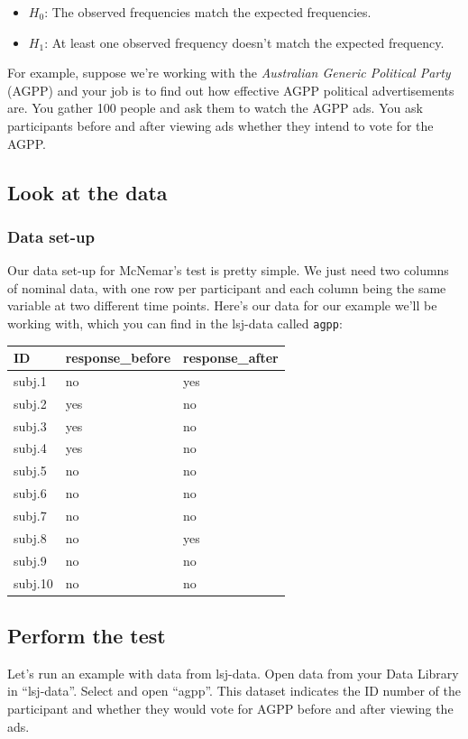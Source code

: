 \documentclass[
]{book}
\begin{document}
\begin{itemize}
\item
  \(H_0\): The observed frequencies match the expected frequencies.
\item
  \(H_1\): At least one observed frequency doesn't match the expected frequency.
\end{itemize}

For example, suppose we're working with the \emph{Australian Generic Political Party} (AGPP) and your job is to find out how effective AGPP political advertisements are. You gather 100 people and ask them to watch the AGPP ads. You ask participants before and after viewing ads whether they intend to vote for the AGPP.

\hypertarget{look-at-the-data-5}{%
\subsection{Look at the data}\label{look-at-the-data-5}}

\hypertarget{data-set-up-5}{%
\subsubsection{Data set-up}\label{data-set-up-5}}

Our data set-up for McNemar's test is pretty simple. We just need two columns of nominal data, with one row per participant and each column being the same variable at two different time points. Here's our data for our example we'll be working with, which you can find in the lsj-data called \texttt{agpp}:

\begin{longtable}[]{@{}lll@{}}
\toprule
ID & response\_before & response\_after\tabularnewline
\midrule
\endhead
subj.1 & no & yes\tabularnewline
subj.2 & yes & no\tabularnewline
subj.3 & yes & no\tabularnewline
subj.4 & yes & no\tabularnewline
subj.5 & no & no\tabularnewline
subj.6 & no & no\tabularnewline
subj.7 & no & no\tabularnewline
subj.8 & no & yes\tabularnewline
subj.9 & no & no\tabularnewline
subj.10 & no & no\tabularnewline
\bottomrule
\end{longtable}

\hypertarget{perform-the-test-5}{%
\subsection{Perform the test}\label{perform-the-test-5}}

Let's run an example with data from lsj-data. Open data from your Data Library in ``lsj-data''. Select and open ``agpp''. This dataset indicates the ID number of the participant and whether they would vote for AGPP before and after viewing the ads.
\end{document}
